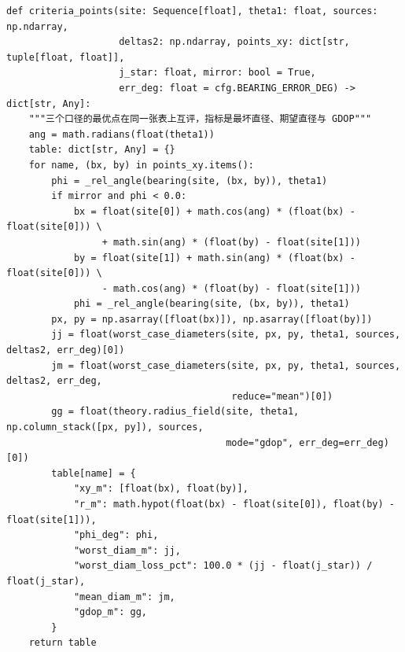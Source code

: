 \documentclass[UTF8, zihao=5,AutoFakeBold=2]{ctexart}
\begin{document}
\begin{lstlisting}
def criteria_points(site: Sequence[float], theta1: float, sources: np.ndarray,
                    deltas2: np.ndarray, points_xy: dict[str, tuple[float, float]],
                    j_star: float, mirror: bool = True,
                    err_deg: float = cfg.BEARING_ERROR_DEG) -> dict[str, Any]:
    """三个口径的最优点在同一张表上互评，指标是最坏直径、期望直径与 GDOP"""
    ang = math.radians(float(theta1))
    table: dict[str, Any] = {}
    for name, (bx, by) in points_xy.items():
        phi = _rel_angle(bearing(site, (bx, by)), theta1)
        if mirror and phi < 0.0:
            bx = float(site[0]) + math.cos(ang) * (float(bx) - float(site[0])) \
                 + math.sin(ang) * (float(by) - float(site[1]))
            by = float(site[1]) + math.sin(ang) * (float(bx) - float(site[0])) \
                 - math.cos(ang) * (float(by) - float(site[1]))
            phi = _rel_angle(bearing(site, (bx, by)), theta1)
        px, py = np.asarray([float(bx)]), np.asarray([float(by)])
        jj = float(worst_case_diameters(site, px, py, theta1, sources, deltas2, err_deg)[0])
        jm = float(worst_case_diameters(site, px, py, theta1, sources, deltas2, err_deg,
                                        reduce="mean")[0])
        gg = float(theory.radius_field(site, theta1, np.column_stack([px, py]), sources,
                                       mode="gdop", err_deg=err_deg)[0])
        table[name] = {
            "xy_m": [float(bx), float(by)],
            "r_m": math.hypot(float(bx) - float(site[0]), float(by) - float(site[1])),
            "phi_deg": phi,
            "worst_diam_m": jj,
            "worst_diam_loss_pct": 100.0 * (jj - float(j_star)) / float(j_star),
            "mean_diam_m": jm,
            "gdop_m": gg,
        }
    return table
	\end{lstlisting}
\end{document}
